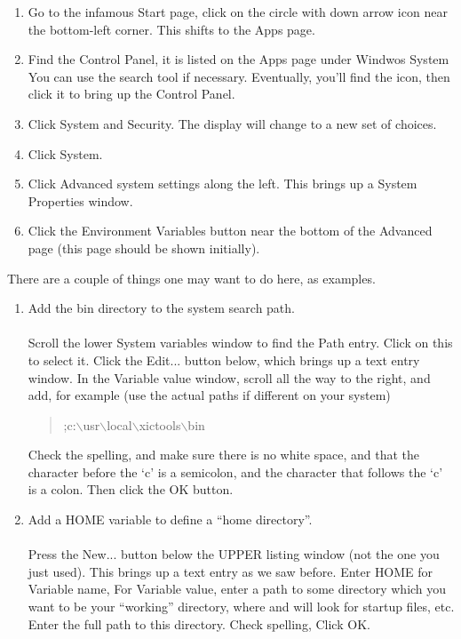 \begin{enumerate}
\item{Go to the infamous {\cb Start} page, click on the circle with
down arrow icon near the bottom-left corner.  This shifts to the {\cb
Apps} page.}

\item{Find the {\cb Control Panel}, it is listed on the {\cb Apps}
page under {\cb Windwos System} You can use the search tool if
necessary.  Eventually, you'll find the icon, then click it to bring
up the {\cb Control Panel}.}

\item{Click {\cb System and Security}.  The display will change to a
new set of choices.}

\item{Click {\cb System}.}

\item{Click {\cb Advanced system settings} along the left.  This
brings up a {\cb System Properties} window.}

\item{Click the {\cb Environment Variables} button near the bottom of
the {\cb Advanced} page (this page should be shown initially).}
\end{enumerate}

There are a couple of things one may want to do here, as examples.

\begin{enumerate}
\item{Add the {\XicTools} {\vt bin} directory  to the system search path.\\\\
Scroll the lower {\cb System variables} window to find the {\vt Path}
entry.  Click on this to select it.  Click the {\cb Edit...} button
below, which brings up a text entry window.  In the {\cb Variable
value} window, scroll all the way to the right, and add, for example
(use the actual paths if different on your system)
\begin{quote}\vt
;c:$\backslash$usr$\backslash$local$\backslash$xictools$\backslash$bin
\end{quote}
Check the spelling, and make sure there is no white space, and that
the character before the `{\vt c}' is a semicolon, and the character
that follows the `{\vt c}' is a colon.  Then click the {\cb OK}
button.}

\item{Add a {\vt HOME} variable to define a ``home directory''.\\\\
Press the {\cb New...} button below the UPPER listing window (not the
one you just used).  This brings up a text entry as we saw before. 
Enter {\vt HOME} for {\cb Variable name}, For {\cb Variable value},
enter a path to some directory which you want to be your ``working''
directory, where {\Xic} and {\WRspice} will look for startup files,
etc.  Enter the full path to this directory.  Check spelling, Click
{\cb OK}.}
\end{enumerate}

